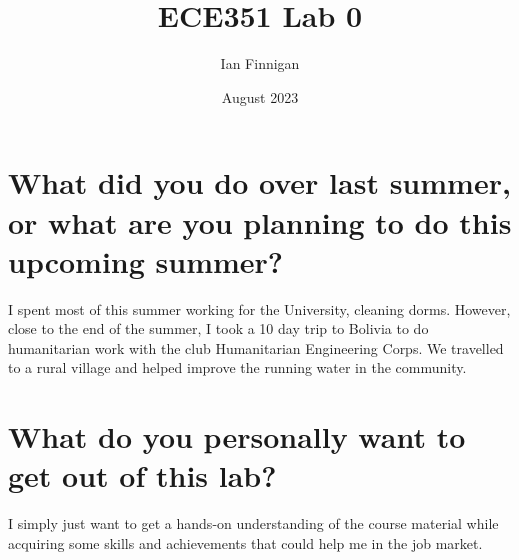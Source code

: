 \documentclass{article}
\title{ECE351 Lab 0}
\author{Ian Finnigan}
\date{August 2023}
\begin{document}
\maketitle

\section{What did you do over last summer, or what are you planning to do this upcoming summer?}
I spent most of this summer working for the University, cleaning dorms. However, close to the end of the summer, I took a 10 day trip to Bolivia to do humanitarian work with the club Humanitarian Engineering Corps. We travelled to a rural village and helped improve the running water in the community.

\section{What do you personally want to get out of this lab?}
I simply just want to get a hands-on understanding of the course material while acquiring some skills and achievements that could help me in the job market.
\end{document}
